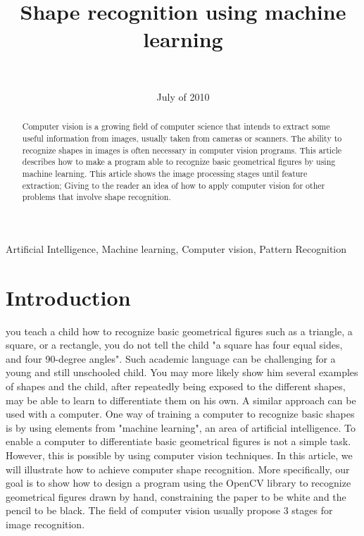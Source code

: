 \documentclass[10pt,journal]{IEEEtran}
\begin{document}
\title {Shape recognition using machine learning}
\author { \\
}
\date {July of 2010}


	\maketitle

	\begin{abstract}
		Computer vision is a growing field of computer science that intends to extract
		some useful information from images, usually taken from cameras or scanners.
		The ability to recognize shapes in images is often necessary in computer vision
		programs. 
		This article describes how to make a program able to recognize basic 
		geometrical figures by using machine learning. This article shows the image 
		processing stages until	feature extraction; Giving to the reader an idea of how
		to apply computer vision for other problems that involve shape recognition.
	\end{abstract}
	
	\begin{IEEEkeywords}
	Artificial Intelligence, Machine learning, Computer vision, Pattern Recognition
	\end{IEEEkeywords}


	\section{Introduction}
	 you teach a child how to recognize basic geometrical figures such
	as a triangle, a square, or a rectangle, you do not tell the child "a square has four
	equal sides, and four 90-degree angles". Such academic language can be challenging for 
	a young and still unschooled child. You may more likely show him several examples
	of shapes and the child, after repeatedly being exposed to the different shapes, may 
	be able to learn to differentiate them on his own. \newline
	A similar approach can be used with a computer. One way of training a computer to
	recognize basic shapes is by using elements from "machine learning", an area of
	artificial intelligence. To enable a computer to differentiate basic geometrical 
	figures is not a simple task. However, this is possible by using computer vision 
	techniques. In this article, we will illustrate how to achieve computer shape 
	recognition. More specifically, our goal is to show how to design a program using
	the OpenCV library to recognize geometrical figures drawn by hand, constraining
	the paper to be white and the pencil to be black. The field of computer vision
	usually	propose 3 stages for image recognition.
	
\end{document}
